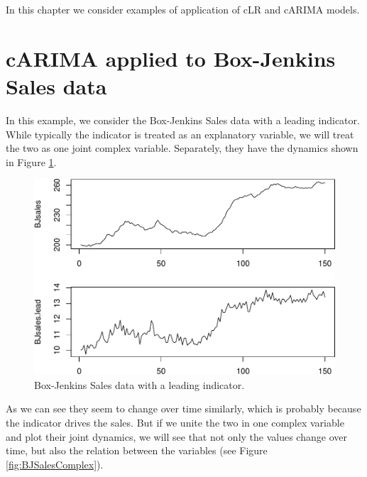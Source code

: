 \documentclass[
]{book}
\begin{document}
In this chapter we consider examples of application of cLR and cARIMA models.

\hypertarget{carima-applied-to-box-jenkins-sales-data}{%
\section{cARIMA applied to Box-Jenkins Sales data}\label{carima-applied-to-box-jenkins-sales-data}}

In this example, we consider the Box-Jenkins Sales data with a leading indicator. While typically the indicator is treated as an explanatory variable, we will treat the two as one joint complex variable. Separately, they have the dynamics shown in Figure \ref{fig:BJSales}.

\begin{figure}
\centering
\includegraphics{Svetunkov---Svetunkov---Complex-Valued-Econometrics_files/figure-latex/BJSales-1.pdf}
\caption{\label{fig:BJSales}Box-Jenkins Sales data with a leading indicator.}
\end{figure}

As we can see they seem to change over time similarly, which is probably because the indicator drives the sales. But if we unite the two in one complex variable and plot their joint dynamics, we will see that not only the values change over time, but also the relation between the variables (see Figure \ref{fig:BJSalesComplex}).
\end{document}
